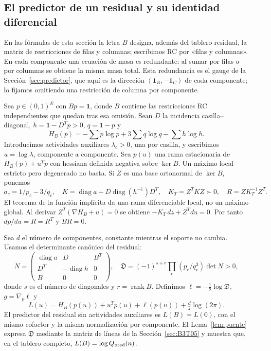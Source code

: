 \subsection{El predictor de un residual y su identidad diferencial}\label{sec:B3T01}
En las fórmulas de esta sección la letra $B$ designa, además del tablero residual, la matriz de
restricciones de filas y columnas; escribimos RC por «filas y columnas». En cada componente una
ecuación de masa es redundante: al sumar por filas o por columnas se obtiene la misma masa total.
Esta redundancia es el gauge de la Sección~\ref{sec:predictor}, que aquí es la dirección
$(\mathbf1_R,-\mathbf1_C)$ de cada componente; lo fijamos omitiendo una restricción de columna por
componente.

Sea $p\in(0,1)^E$ con $Bp=\mathbf1$, donde $B$ contiene las restricciones RC independientes que
quedan tras esa omisión. Sean $D$ la incidencia casilla--diagonal, $h=\mathbf1-D^Tp>0$,
$q=\mathbf1-p$ y
\[
 H_B(p)=-\sum p\log p+3\sum q\log q-\sum h\log h.
\]
Introducimos actividades auxiliares $\lambda_c>0$, una por casilla, y escribimos $u=\log\lambda$,
componente a componente. Sea $p(u)$ una rama estacionaria de
$H_B(p)+u^Tp$ con hessiana definida negativa sobre $\ker B$.
Un máximo local estricto pero degenerado no basta.
Si $Z$ es una base ortonormal de $\ker B$, ponemos
\[
 a_c=1/p_c-3/q_c,\quad
 K=\operatorname{diag}a+D\operatorname{diag}(h^{-1})D^T,\quad
 K_T=Z^TKZ\succ0,\quad R=ZK_T^{-1}Z^T.
\]
El teorema de la función implícita da una rama diferenciable local, no un máximo global.
Al derivar $Z^T(\nabla H_B+u)=0$ se obtiene $-K_T\,dz+Z^Tdu=0$.
Por tanto $dp/du=R=R^T$ y $BR=0$.

Sea $d$ el número de componentes, constante mientras el soporte no cambia.
Usamos el determinante canónico del residual:
\[
 N=\begin{pmatrix}
 \operatorname{diag}a&D&B^T\\ D^T&-\operatorname{diag}h&0\\ B&0&0
 \end{pmatrix},\quad
 \mathfrak D=(-1)^{s+r}\prod_c(p_c/q_c^3)\det N>0,
\]
donde $s$ es el número de diagonales y $r=\operatorname{rank}B$.
Definimos $\ell=-\tfrac12\log\mathfrak D$, $g=\nabla_p\ell$ y
\[
 L(u)=H_B(p(u))+u^Tp(u)+\ell(p(u))+\tfrac d2\log(2\pi).
\]
El predictor del residual sin actividades auxiliares es $L(B)=L(0)$, con el mismo cofactor y la
misma normalización por componente.
El Lema~\ref{lem:puente} expresa $\mathfrak D$ mediante la matriz de líneas de la
Sección~\ref{sec:B3T05} y muestra que, en el tablero completo, $L(B)=\log Q_{\rm pred}(n)$.
